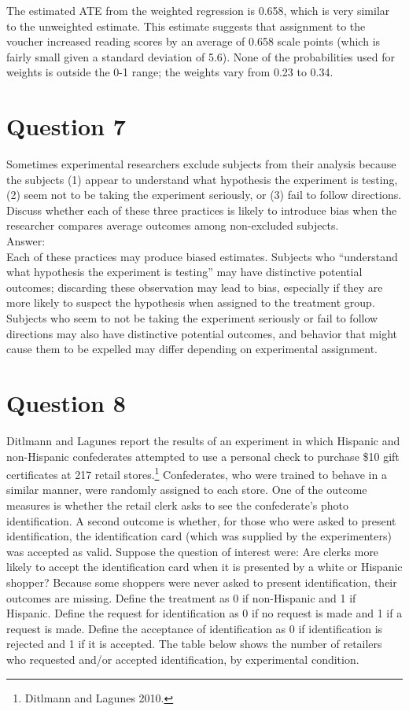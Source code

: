 \documentclass[11pt,notitlepage]{article}\usepackage[]{graphicx}\usepackage[]{color}
\begin{document}
The estimated ATE from the weighted regression is 0.658, which is very similar to the unweighted estimate. This estimate suggests that assignment to the voucher increased reading scores by an average of 0.658 scale points (which is fairly small given a standard deviation of 5.6). None of the probabilities used for weights is outside the 0-1 range; the weights vary from 0.23 to 0.34.

\section*{Question 7}
Sometimes experimental researchers exclude subjects from their analysis because the subjects (1) appear to understand what hypothesis the experiment is testing, (2) seem not to be taking the experiment seriously, or (3) fail to follow directions. Discuss whether each of these three practices is likely to introduce bias when the researcher compares average outcomes among non-excluded subjects.\\
Answer:\\
Each of these practices may produce biased estimates. Subjects who ``understand what hypothesis the experiment is testing'' may have distinctive potential outcomes; discarding these observation may lead to bias, especially if they are more likely to suspect the hypothesis when assigned to the treatment group. Subjects who seem to not be taking the experiment seriously or fail to follow directions may also have distinctive potential outcomes, and behavior that might cause them to be expelled may differ depending on experimental assignment.


\section*{Question 8}
Ditlmann and Lagunes report the results of an experiment in which Hispanic and non-Hispanic confederates attempted to use a personal check to purchase \$10 gift certificates at 217 retail stores.\footnote{Ditlmann and Lagunes 2010.} Confederates, who were trained to behave in a similar manner, were randomly assigned to each store. One of the outcome measures is whether the retail clerk asks to see the confederate's photo identification. A second outcome is whether, for those who were asked to present identification, the identification card (which was supplied by the experimenters) was accepted as valid. Suppose the question of interest were: Are clerks more likely to accept the identification card when it is presented by a white or Hispanic shopper? Because some shoppers were never asked to present identification, their outcomes are missing. Define the treatment as 0 if non-Hispanic and 1 if Hispanic. Define the request for identification as 0 if no request is made and 1 if a request is made. Define the acceptance of identification as 0 if identification is rejected and 1 if it is accepted. The table below shows the number of retailers who requested and/or accepted identification, by experimental condition.
\end{document}
